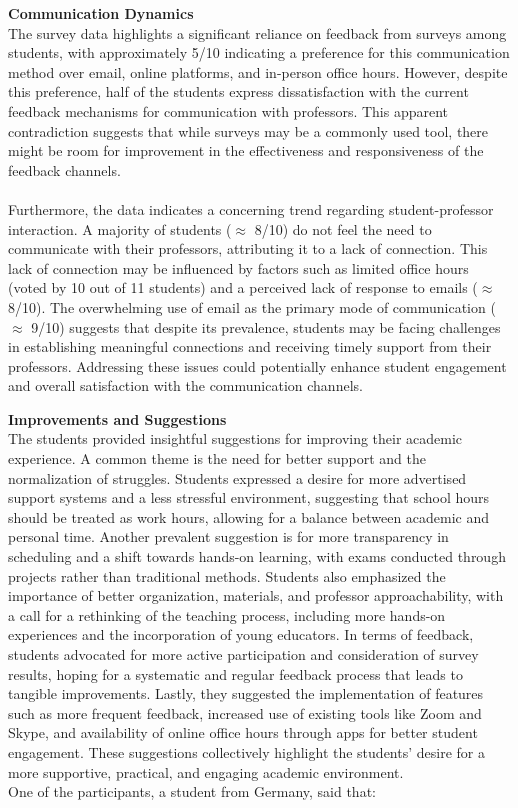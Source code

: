 \noindent \textbf{Communication Dynamics} \\
The survey data highlights a significant reliance on feedback from surveys among students, with approximately 5/10 indicating a preference for this communication method over email, online platforms, and in-person office hours. However, despite this preference, half of the students express dissatisfaction with the current feedback mechanisms for communication with professors. This apparent contradiction suggests that while surveys may be a commonly used tool, there might be room for improvement in the effectiveness and responsiveness of the feedback channels.\\ \\
Furthermore, the data indicates a concerning trend regarding student-professor interaction. A majority of students ($\approx$ 8/10) do not feel the need to communicate with their professors, attributing it to a lack of connection. This lack of connection may be influenced by factors such as limited office hours (voted by 10 out of 11 students) and a perceived lack of response to emails ($\approx$ 8/10). The overwhelming use of email as the primary mode of communication ($\approx$ 9/10) suggests that despite its prevalence, students may be facing challenges in establishing meaningful connections and receiving timely support from their professors. Addressing these issues could potentially enhance student engagement and overall satisfaction with the communication channels.

\vspace{5mm}

\noindent \textbf{Improvements and Suggestions} \\
The students provided insightful suggestions for improving their academic experience. A common theme is the need for better support and the normalization of struggles. Students expressed a desire for more advertised support systems and a less stressful environment, suggesting that school hours should be treated as work hours, allowing for a balance between academic and personal time. Another prevalent suggestion is for more transparency in scheduling and a shift towards hands-on learning, with exams conducted through projects rather than traditional methods. Students also emphasized the importance of better organization, materials, and professor approachability, with a call for a rethinking of the teaching process, including more hands-on experiences and the incorporation of young educators. In terms of feedback, students advocated for more active participation and consideration of survey results, hoping for a systematic and regular feedback process that leads to tangible improvements. Lastly, they suggested the implementation of features such as more frequent feedback, increased use of existing tools like Zoom and Skype, and availability of online office hours through apps for better student engagement. These suggestions collectively highlight the students' desire for a more supportive, practical, and engaging academic environment.\vspace{5mm} \\
One of the participants, a student from Germany, said that:

